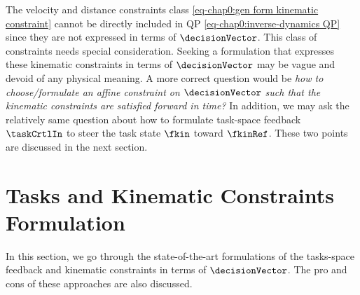 The velocity and distance constraints class \cref{eq-chap0:gen form kinematic constraint} cannot be directly included in QP \cref{eq-chap0:inverse-dynamics QP} since they are not expressed in terms of $\decisionVector$. This class of constraints needs special consideration. Seeking a formulation that expresses these kinematic constraints in terms of $\decisionVector$ may be vague and devoid of any physical meaning. A more correct question would be \emph{how to choose/formulate an affine constraint on $\decisionVector$ such that the kinematic constraints are satisfied forward in time?} In addition, we may ask the relatively same question about how to formulate task-space feedback $\taskCrtlIn$ to steer the task state $\fkin$ toward $\fkinRef$. 
These two points are discussed in the next section.




\section{Tasks and Kinematic Constraints Formulation}\label{sec-chap0:Task and Kinematic Constraints Formulation}
In this section, we go through the state-of-the-art formulations of the tasks-space feedback and kinematic constraints in terms of $\decisionVector$. The pro and cons of these approaches are also discussed. 
